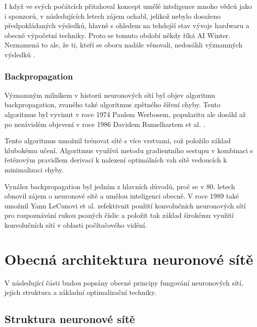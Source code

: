 
I když ve svých počátcích přitahoval koncept umělé inteligence mnoho vědců jako
i sponzorů, v následujících letech zájem ochabl, jelikož nebylo dosaženo
předpokládaných výsledků, hlavně s ohledem na tehdejší stav vývoje hardwaru a
obecně výpočetní techniky. Proto se tomuto období někdy říká AI Winter.
Neznamená to ale, že ti, kteří se oboru nadále věnovali, nedosáhli významných
výsledků \cite{nn_history}.

\subsubsection*{Backpropagation}
Významným milníkem v historii neuronových sítí byl objev algoritmu
backpropagation, zvaného také algoritmus zpětného šíření chyby. Tento
algoritmus byl vyvinut v roce 1974 Paulem Werbosem, popularitu ale dosáhl až po
nezávislém objevení v roce 1986 Davidem Rumelhartem et al.
\cite{backpropagation}.

Tento algoritmus umožnil trénovat sítě s více vrstvami, což položilo základ
hlubokému učení. Algoritmus využívá metodu gradientního sestupu v kombinaci s
řetězovým pravidlem derivací k nalezení optimálních vah sítě vedoucích k
minimalizaci chyby.

Vynález backpropagation byl jedním z hlavních důvodů, proč se v 80. letech
obnovil zájem o neuronové sítě a umělou inteligenci obecně. V roce 1989 také
umožnil Yann LeCunovi et al. zefektivnit použití konvolučních neuronových sítí
pro rozpoznávání rukou psaných číslic \cite{lecun1989} a položit tak základ
širokému využití konvolučních sítí v oblasti počítačového vidění.

\section{Obecná architektura neuronové sítě}

V následující části budou popsány obecné principy fungování neuronových sítí,
jejich struktura a základní optimalizační techniky.

\subsection{Struktura neuronové sítě}

